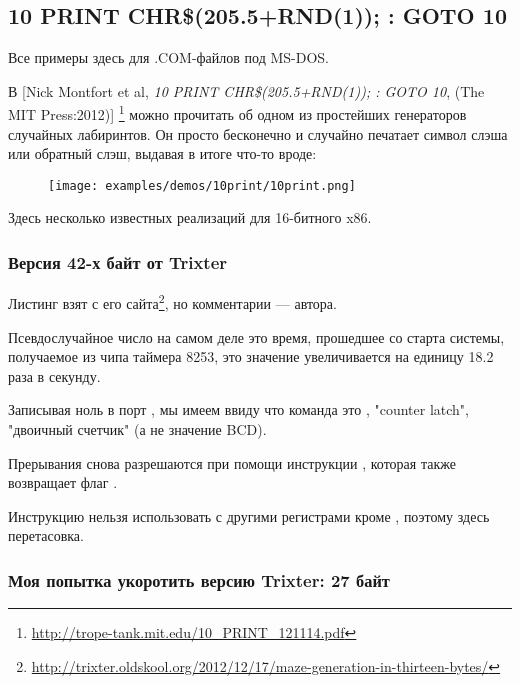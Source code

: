 \subsection{10 PRINT CHR\$(205.5+RND(1)); : GOTO 10}

Все примеры здесь для .COM-файлов под MS-DOS.

В [Nick Montfort et al, \emph{10 PRINT CHR\$(205.5+RND(1)); : GOTO 10}, (The MIT Press:2012)]
\footnote{\AlsoAvailableAs \url{http://trope-tank.mit.edu/10_PRINT_121114.pdf}}
можно прочитать об одном из простейших генераторов случайных лабиринтов.
Он просто бесконечно и случайно печатает символ слэша или обратный слэш, выдавая в итоге что-то вроде:

\begin{figure}[H]
\centering
\texttt{[image: examples/demos/10print/10print.png]}
\end{figure}

Здесь несколько известных реализаций для 16-битного x86.

\subsubsection{Версия 42-х байт от Trixter}

\newcommand{\FNURLTRIXTER}{\footnote{\url{http://trixter.oldskool.org/2012/12/17/maze-generation-in-thirteen-bytes/}}}

Листинг взят с его сайта\FNURLTRIXTER, но комментарии --- автора.



Псевдослучайное число на самом деле это время, прошедшее со старта системы, получаемое из чипа таймера 8253, 
это значение
увеличивается на единицу 18.2 раза в секунду.

Записывая ноль в порт , 
мы имеем ввиду что команда это , 
"counter latch", 
"двоичный счетчик" (а не значение \ac{BCD}).

Прерывания снова разрешаются при помощи инструкции , которая
также возвращает флаг .

Инструкцию  нельзя использовать с другими регистрами кроме , поэтому здесь перетасовка.

\subsubsection{Моя попытка укоротить версию Trixter: 27 байт}

